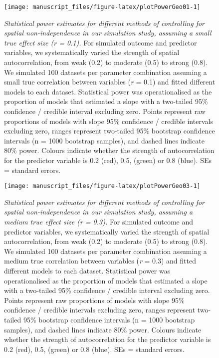 \documentclass[
  man,floatsintext]{apa6}
\begin{document}
\begin{figure}[H]
\texttt{[image: manuscript\_files/figure-latex/plotPowerGeo01-1]} \caption{\emph{Statistical power estimates for different methods of controlling for spatial non-independence in our simulation study, assuming a small true effect size (r = 0.1).} For simulated outcome and predictor variables, we systematically varied the strength of spatial autocorrelation, from weak (0.2) to moderate (0.5) to strong (0.8). We simulated 100 datasets per parameter combination assuming a small true correlation between variables (\emph{r} = 0.1) and fitted different models to each dataset. Statistical power was operationalised as the proportion of models that estimated a slope with a two-tailed 95\% confidence / credible interval excluding zero. Points represent raw proportions of models with slope 95\% confidence / credible intervals excluding zero, ranges represent two-tailed 95\% bootstrap confidence intervals (n = 1000 bootstrap samples), and dashed lines indicate 80\% power. Colours indicate whether the strength of autocorrelation for the predictor variable is 0.2 (red), 0.5, (green) or 0.8 (blue). SEs = standard errors.}\label{fig:plotPowerGeo01}
\end{figure}

\newpage



\begin{figure}[H]
\texttt{[image: manuscript\_files/figure-latex/plotPowerGeo03-1]} \caption{\emph{Statistical power estimates for different methods of controlling for spatial non-independence in our simulation study, assuming a medium true effect size (r = 0.3).} For simulated outcome and predictor variables, we systematically varied the strength of spatial autocorrelation, from weak (0.2) to moderate (0.5) to strong (0.8). We simulated 100 datasets per parameter combination assuming a medium true correlation between variables (\emph{r} = 0.3) and fitted different models to each dataset. Statistical power was operationalised as the proportion of models that estimated a slope with a two-tailed 95\% confidence / credible interval excluding zero. Points represent raw proportions of models with slope 95\% confidence / credible intervals excluding zero, ranges represent two-tailed 95\% bootstrap confidence intervals (n = 1000 bootstrap samples), and dashed lines indicate 80\% power. Colours indicate whether the strength of autocorrelation for the predictor variable is 0.2 (red), 0.5, (green) or 0.8 (blue). SEs = standard errors.}\label{fig:plotPowerGeo03}
\end{figure}
\end{document}
